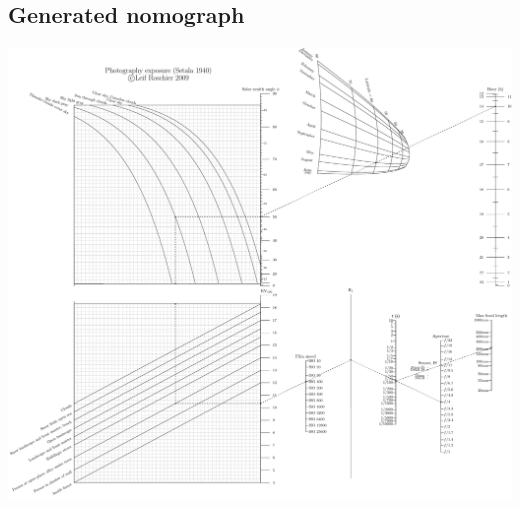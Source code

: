 \documentclass[a4paper,11pt,english]{sphinxmanual}
\begin{document}
\subsection{Generated nomograph}
\label{examples/examples:id12}
\includegraphics{ex_photo_exposure.pdf}
\end{document}
